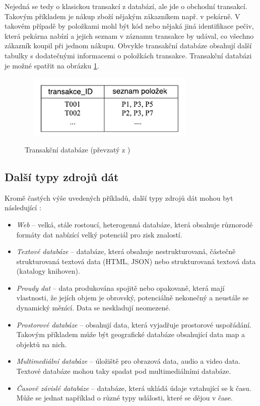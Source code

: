 Nejedná se tedy o klasickou transakcí z databází, ale jde o obchodní transakcí. Takovým příkladem je nákup zboží nějakým zákazníkem např. v pekárně. V takovém případě by položkami mohl být kód nebo nějaká jiná identifikace pečiv, která pekárna nabízí a jejich seznam v záznamu transakce by udával, co všechno zákazník koupil při jednom nákupu. Obvykle transakční databáze obsahují další tabulky s dodatečnými informacemi o položkách transakce. Transakční databázi je možné spatřit na obrázku \ref{trasakcni-tabulka}.

\begin{figure}[h]\centering
  \centering
  \includegraphics[width=3.5in,height=1.2in]{obrazky/db-transakce.pdf}\\[1pt]
  \caption{Transakční databáze (převzatý z \cite{Han})}
  \label{trasakcni-tabulka}
\end{figure}

\subsection*{Další typy zdrojů dát}
Kromě častých výše uvedených příkladů, další typy zdrojů dát mohou byt následující \cite{Han}:
\begin{itemize}
    \item \textit{Web} -- velká, stále rostoucí, heterogenná databáze, která obsahuje různorodé formáty dat nabízící velký potenciál pro zisk znalostí.
    \item \textit{Textové databáze} -- databáze, která obsahuje nestrukturovaná, částečně strukturovaná textová data (HTML, JSON) nebo strukturovaná textová data (katalogy knihoven).
    \item \textit{Proudy dat} -- data produkována spojitě nebo opakovaně, která mají vlastnosti, že jejích objem je obrovský, potenciálně nekonečný a neustále se dynamický měnící. Data se neskladují neomezené. 
    \item \textit{Prostorové databáze} -- obsahují data, která vyjadřuje prostorové uspořádání. Takovým příkladem může být geografické databáze obsahující data map a objektů na nich.
    \item \textit{Multimediální databáze} -- úložiště pro obrazová data,  audio a video data. Textové databáze mohou taky spadat pod multimediálními databáze.
    \item \textit{Časově závislé databáze} -- databáze, která ukládá údaje vztahující se k času. Může se jednat například o různé typy události, které se dějou v čase.
\end{itemize}
